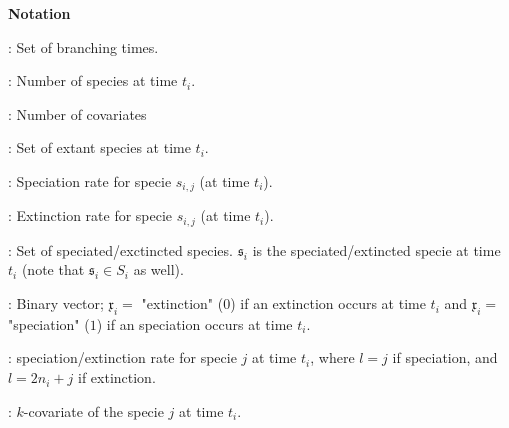 \begin{center}
{\Large \bf Notation}
\end{center}


\begin{description}[leftmargin=!,labelwidth=\widthof{\bfseries The longest label}]
\item[$\mathcal{T} = \{t_1,...,t_p\}:$] : Set of branching times.
\item[$n_i$] : Number of species at time $t_i$.
\item[$m$] : Number of covariates
\item[$S_i = \{ s_{i,1},...,s_{i,n_i}\}$] : Set of extant species at time $t_i$.
\item[$\lambda_{i,j}$] : Speciation rate for specie $s_{i,j}$ (at time $t_i$).
\item[$\mu_{i,j}$] : Extinction rate for specie $s_{i,j}$ (at time $t_i$).
\item[$\mathfrak{S} = \{\mathfrak{s}_1,...,\mathfrak{s}_p\}$] : Set of speciated/exctincted species. $\mathfrak{s}_i$ is the speciated/extincted specie at time $t_i$ (note that $\mathfrak{s}_i \in S_i$ as well). 
\item[$\mathfrak{X} = \{ \mathfrak{x}_1, ..., \mathfrak{x}_n \} $] : Binary vector; $\mathfrak{x}_i =$ "extinction" ($0$) if an extinction occurs at time $t_i$ and $\mathfrak{x}_i =$ "speciation" ($1$) if an speciation occurs at time $t_i$. 
\item[$\rho_{i,l}$] : speciation/extinction rate for specie $j$ at time $t_i$, where $l=j$ if speciation, and $l=2n_i+j$ if extinction.
\item[$x_{i,j,k}$] : $k$-covariate of the specie $j$ at time $t_i$.
\end{description}

